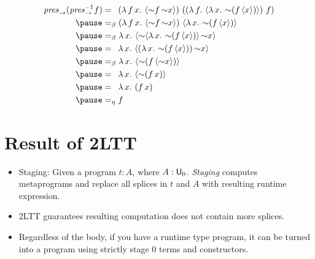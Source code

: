 \documentclass[handout]{beamer}
\newenvironment{fr}[1][]
{\begin{frame}[fragile,environment=fr,#1]}
{\end{frame}}
\begin{document}
\begin{fr}{\subsecname}
    $$
    \begin{aligned}
      \mit{pres}_\to (\mit{pres}_\to^{-1} f)&=\,\,\,(\lambda\,f\,x.\,\,\qut{\spl f\,\spl x})\,\, ((\lambda\,f.\,\,\qut{\lambda\,x.\,\,\spl(f\,\qut{x})})\,\, f) \\
      \pause&=_\beta (\lambda\,f\,x.\,\,\qut{\spl f\,\spl x})\,\, \qut{\lambda\,x.\,\,\spl(f\,\qut{x})}\\
      \pause&=_\beta \lambda\,x.\,\,\qut{\spl \qut{\lambda\,x.\,\,\spl(f\,\qut{x})}\,\spl x} \\
      \pause&=\,\,\, \lambda\,x.\,\,\qut{(\lambda\,x.\,\,\spl(f\,\qut{x}))\,\spl x} \\
      \pause&=_\beta \lambda\,x.\,\,\qut{\spl(f\,\qut{\spl x})} \\
      \pause&=\,\,\, \lambda\,x.\,\,\qut{\spl(f\, x)} \\
      \pause&=\,\,\, \lambda\,x.\,\,(f\, x) \\
      \pause&=_\eta f
    \end{aligned}
    $$
\end{fr}




\section{Result of 2LTT}
\begin{fr}{\secname}
    \begin{itemize}
        \item Staging: Given a program $t : A$, where $A : \mathsf{U}_0$. \emph{Staging} computes metaprograms and replace all splices in $t$ and $A$ with resulting runtime expression.
        \item 2LTT guarantees resulting computation does not contain more splices.
        \item Regardless of the body, if you have a runtime type program, it can be turned into a program using strictly stage 0 terms and constructors.
    \end{itemize}
\end{fr}
\end{document}
